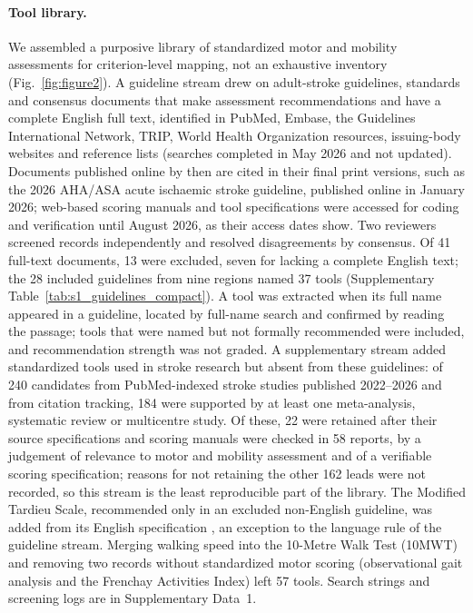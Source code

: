 \documentclass[11pt]{article}
\begin{document}
\paragraph{Tool library.} We assembled a purposive library of standardized motor and mobility assessments for criterion-level mapping, not an exhaustive inventory (Fig.~\ref{fig:figure2}). A guideline stream drew on adult-stroke guidelines, standards and consensus documents that make assessment recommendations and have a complete English full text, identified in PubMed, Embase, the Guidelines International Network, TRIP, World Health Organization resources, issuing-body websites and reference lists (searches completed in May 2026 and not updated). Documents published online by then are cited in their final print versions, such as the 2026 AHA/ASA acute ischaemic stroke guideline, published online in January 2026; web-based scoring manuals and tool specifications were accessed for coding and verification until August 2026, as their access dates show. Two reviewers screened records independently and resolved disagreements by consensus. Of 41 full-text documents, 13 were excluded, seven for lacking a complete English text; the 28 included guidelines from nine regions named 37 tools (Supplementary Table~\ref{tab:s1_guidelines_compact}). A tool was extracted when its full name appeared in a guideline, located by full-name search and confirmed by reading the passage; tools that were named but not formally recommended were included, and recommendation strength was not graded. A supplementary stream added standardized tools used in stroke research but absent from these guidelines: of 240 candidates from PubMed-indexed stroke studies published 2022--2026 and from citation tracking, 184 were supported by at least one meta-analysis, systematic review or multicentre study. Of these, 22 were retained after their source specifications and scoring manuals were checked in 58 reports, by a judgement of relevance to motor and mobility assessment and of a verifiable scoring specification; reasons for not retaining the other 162 leads were not recorded, so this stream is the least reproducible part of the library. The Modified Tardieu Scale, recommended only in an excluded non-English guideline, was added from its English specification \cite{S2RehabMeasuresModifiedTardieu}, an exception to the language rule of the guideline stream. Merging walking speed into the 10-Metre Walk Test (10MWT) and removing two records without standardized motor scoring (observational gait analysis and the Frenchay Activities Index) left 57 tools. Search strings and screening logs are in Supplementary Data~1.
\end{document}
